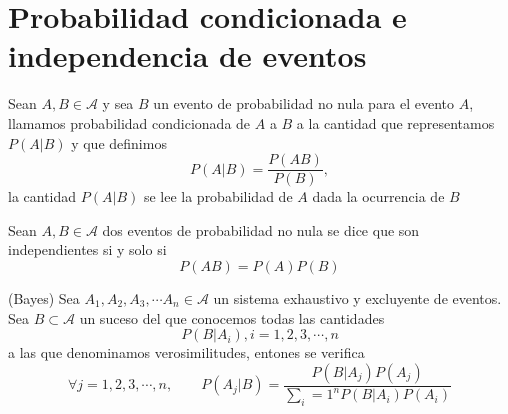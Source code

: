 \documentclass{article}%
\begin{document}
\section{Probabilidad condicionada e independencia de eventos}%

\begin{definition}
Sean $A,B\in\mathcal{A}$ y sea $B$ un evento de probabilidad no nula para el
evento $A$, llamamos probabilidad condicionada de $A$ a $B$ a la cantidad que
representamos $P\left(   A|B\right)   $ y que definimos \[ P\left(
A|B\right)   =\frac{P\left(   AB\right)   }{P\left(   B\right)   }, \] la
cantidad $P\left(   A|B\right)   $ se lee la probabilidad de $A$ dada la
ocu\-rrencia de $B$
\end{definition} %

\begin{definition}
Sean $A,B\in\mathcal{A}$ dos eventos de probabilidad no nula se dice que son
independientes si y solo si \[ P\left(   AB\right)   =P\left(   A\right)
P\left(   B\right)  \]
\end{definition}%

\begin{theorem}
(Bayes) Sea $A_{1},A_{2},A_{3},\cdots A_{n}\in\mathcal{A}$ un sistema
exhaustivo y excluyente de eventos. Sea $B\subset\mathcal{A}$ un suceso del
que conocemos todas las cantidades \[ P\left(   B|A_i\right)   ,i=1,2,3,\cdots
,n \] a las que denominamos verosimilitudes, entones se verifica \[ \forall
j=1,2,3,\cdots,n,\qquad P\left(   A_j|B\right)   =\frac{P\left(
B|A_j\right)   P\left(   A_j\right)   }{\sum_i=1^nP\left(   B|A_i
\right)   P\left(   A_i\right)   }
\]
\end{theorem}

\end{document}
